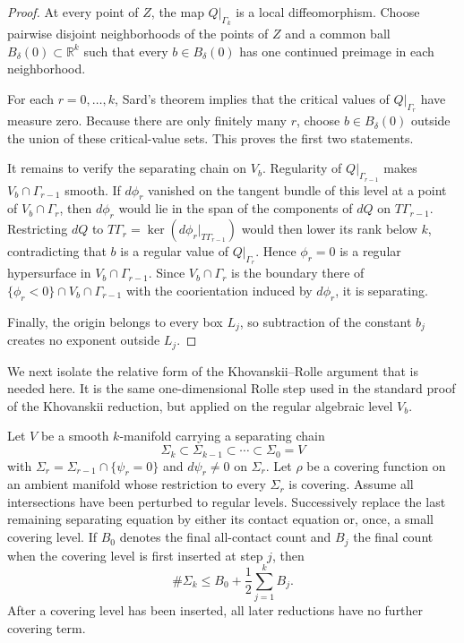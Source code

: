 \begin{proof}
At every point of $Z$, the map $Q|_{\Gamma_k}$ is a local diffeomorphism.
Choose pairwise disjoint neighborhoods of the points of $Z$ and a common ball
$B_\delta(0)\subset\mathbb R^k$ such that every $b\in B_\delta(0)$ has one
continued preimage in each neighborhood.

For each $r=0,\ldots,k$, Sard's theorem implies that the critical values of
$Q|_{\Gamma_r}$ have measure zero.  Because there are only finitely many
$r$, choose $b\in B_\delta(0)$ outside the union of these critical-value sets.
This proves the first two statements.

It remains to verify the separating chain on $V_b$.  Regularity of
$Q|_{\Gamma_{r-1}}$ makes $V_b\cap\Gamma_{r-1}$ smooth.  If
$d\phi_r$ vanished on the tangent bundle of this level at a point of
$V_b\cap\Gamma_r$, then $d\phi_r$ would lie in the span of the components of
$dQ$ on $T\Gamma_{r-1}$.  Restricting $dQ$ to
$T\Gamma_r=\ker(d\phi_r|_{T\Gamma_{r-1}})$ would then lower its rank below
$k$, contradicting that $b$ is a regular value of $Q|_{\Gamma_r}$.  Hence
$\phi_r=0$ is a regular hypersurface in $V_b\cap\Gamma_{r-1}$.  Since
$V_b\cap\Gamma_r$ is the boundary there of
$\{\phi_r<0\}\cap V_b\cap\Gamma_{r-1}$ with the coorientation induced by
$d\phi_r$, it is separating.

Finally, the origin belongs to every box $L_j$, so subtraction of the constant
$b_j$ creates no exponent outside $L_j$.
\end{proof}

We next isolate the relative form of the Khovanskii--Rolle argument that is
needed here.  It is the same one-dimensional Rolle step used in the standard
proof of the Khovanskii reduction, but applied on the regular algebraic level
$V_b$.

\begin{proposition}
\label{prop:rg-relative-KR}
Let $V$ be a smooth $k$-manifold carrying a separating chain
\[
 \Sigma_k\subset\Sigma_{k-1}\subset\cdots\subset\Sigma_0=V
\]
with $\Sigma_r=\Sigma_{r-1}\cap\{\psi_r=0\}$ and
$d\psi_r\ne0$ on $\Sigma_r$.  Let $\rho$ be a covering function on an ambient
manifold whose restriction to every $\Sigma_r$ is covering.  Assume all
intersections have been perturbed to regular levels.  Successively replace the
last remaining separating equation by either its contact equation or, once,
a small covering level.  If $B_0$ denotes the final all-contact count and
$B_j$ the final count when the covering level is first inserted at step $j$,
then
\begin{equation}\label{eq:rg-KR-inequality}
 \#\Sigma_k\le B_0+\frac12\sum_{j=1}^kB_j.
\end{equation}
After a covering level has been inserted, all later reductions have no further
covering term.
\end{proposition}

